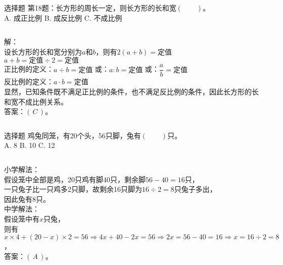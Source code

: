 \documentclass[aspectratio=169]{ctexbeamer} %
\begin{document}
\begin{frame}[t]{选择题}
第18题：长方形的周长一定，则长方形的长和宽$(\qquad)$。\\
A. 成正比例 \hspace{2em} B. 成反比例 \hspace{2em} C. 不成比例 \\
\pause
\vspace{1em}
\begin{columns}
解：\\
设长方形的长和宽分别为$a$和$b$，则有$2(a + b) = \text{定值}$\\
$a + b = \text{定值} \div 2 = \text{定值}$ \\
正比例的定义：$a \div b = \text{定值}$ 或：$a : b = \text{定值}$ 或：$\dfrac{a}{b} = \text{定值}$\\
反比例的定义：$a \cdot b = \text{定值}$ \\
显然，已知条件既不满足正比例的条件，也不满足反比例的条件，因此长方形的长和宽不成比例关系。\\
\vspace{1em}
答案：\alert{$(\, C \, )$}。
\end{columns}
\end{frame}

\begin{frame}[t]{选择题}
鸡兔同笼，有20个头，56只脚，兔有$(\qquad)$只。\\
A. 8 \hspace{1em} B. 10 \hspace{1em} C. 12 \\
\pause
\vspace{1em}
\begin{columns}
小学解法：\\
假设笼中全部是鸡，20只鸡有脚40只，剩余脚$56 - 40 = 16$只，\\
一只兔子比一只鸡多2只脚，故剩余16只脚为$16 \div 2 = 8$只兔子多出，\\
因此兔有\alert{$8$}只。\\
\vspace{1em}
中学解法：\\
假设笼中有$x$只兔，\\
则有$x \times 4 + (20 - x) \times 2 = 56 \Rightarrow 4x + 40 - 2x = 56 \Rightarrow 2x = 56 - 40 = 16 \Rightarrow x = 16 \div 2 = 8$，\\
答案：\alert{$(\, A \, )$}。
\end{columns}
\end{frame}
\end{document}
